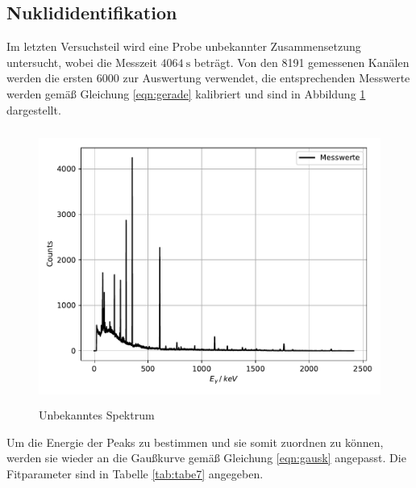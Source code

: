 \subsection{Nuklididentifikation}
Im letzten Versuchsteil wird eine Probe unbekannter Zusammensetzung untersucht, wobei die
Messzeit $\SI{4064}{\second}$ beträgt. Von den 8191 gemessenen Kanälen werden die ersten 6000 zur Auswertung
verwendet, die entsprechenden Messwerte werden gemäß Gleichung \ref{eqn:gerade} kalibriert und
sind in Abbildung \ref{fig:plot8} dargestellt.
\begin{figure}
  \centering
  \includegraphics[height=9cm]{Un.pdf}
  \caption{Unbekanntes Spektrum}
  \label{fig:plot8}
\end{figure}

Um die Energie der Peaks zu bestimmen und sie somit zuordnen zu können, werden sie
wieder an die Gaußkurve gemäß Gleichung \ref{eqn:gausk} angepasst. Die Fitparameter sind in Tabelle
\ref{tab:tabe7} angegeben.

